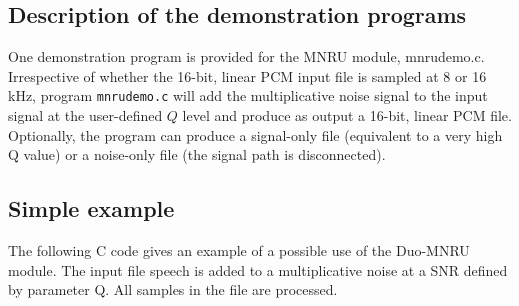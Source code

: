 \subsection {Description of the demonstration programs}

One demonstration program is provided for the MNRU module, mnrudemo.c.
Irrespective of whether the 16-bit, linear PCM input file is sampled
at 8 or 16 kHz, program {\tt mnrudemo.c} will add the multiplicative
noise signal to the input signal at the user-defined $Q$ level and
produce as output a 16-bit, linear PCM file. Optionally, the program
can produce a signal-only file (equivalent to a very high Q value) or
a noise-only file (the signal path is disconnected).


\subsection {Simple example}

The following C code gives an example of a possible use of the Duo-MNRU module.
The input file speech is added to a multiplicative noise at a SNR defined by
parameter Q. All samples in the file are processed.

